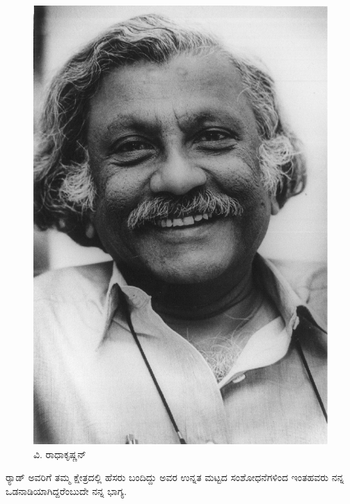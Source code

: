 \begin{figure}[!htpb]
\centering
\includegraphics[scale=0.24]{"images/18.jpg"}
\caption{ವಿ. ರಾಧಾಕೃಷ್ಣನ್}\label{chap5-fig03}
\end{figure}


ರ‍್ಯಾಡ್ ಅವರಿಗೆ ತಮ್ಮ ಕ್ಷೇತ್ರದಲ್ಲಿ ಹೆಸರು ಬಂದಿದ್ದು ಅವರ ಉನ್ನತ ಮಟ್ಟದ ಸಂಶೋಧನೆಗಳಿಂದ ಇಂತಹವರು ನನ್ನ ಒಡನಾಡಿಯಾಗಿದ್ದರೆಂಬುದೇ ನನ್ನ ಭಾಗ್ಯ.

